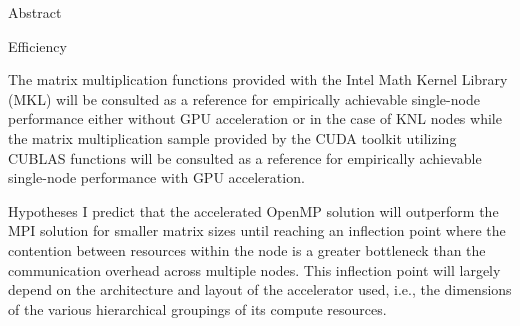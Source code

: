\documentclass{article}
\begin{document}
\begin{section}{Abstract}
\begin{subsection}{Efficiency}
\begin{paragraph}{}
    \end{paragraph}
    \begin{paragraph}{}
      The matrix multiplication functions provided with the Intel Math Kernel Library (MKL) will be consulted as a reference for empirically
      achievable single-node performance either without GPU acceleration or in the case of KNL nodes while the matrix multiplication sample provided
      by the CUDA toolkit utilizing CUBLAS functions will be consulted as a reference for empirically achievable single-node performance
      with GPU acceleration.
    \end{paragraph}
  \end{subsection}
  \begin{subsection}{Hypotheses}
    I predict that the accelerated OpenMP solution will outperform the MPI solution for smaller matrix sizes until
    reaching an inflection point where the contention between resources within the node is a greater bottleneck than
    the communication overhead across multiple nodes. This inflection point will largely depend on the architecture
    and layout of the accelerator used, i.e., the dimensions of the various hierarchical groupings of its compute resources.
  \end{subsection}
\end{section}

\printbibliography
\end{document}
